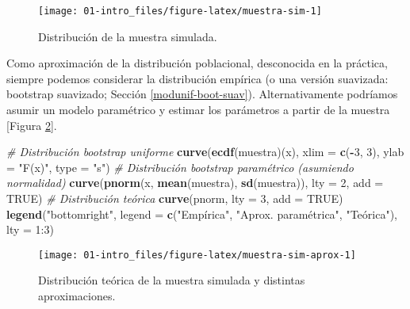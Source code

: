 \documentclass[
]{book}
\newenvironment{Shaded}{\begin{snugshade}}{\end{snugshade}}
\newcommand{\CommentTok}[1]{\textcolor[rgb]{0.56,0.35,0.01}{\textit{#1}}}
\newcommand{\DataTypeTok}[1]{\textcolor[rgb]{0.13,0.29,0.53}{#1}}
\newcommand{\DecValTok}[1]{\textcolor[rgb]{0.00,0.00,0.81}{#1}}
\newcommand{\KeywordTok}[1]{\textcolor[rgb]{0.13,0.29,0.53}{\textbf{#1}}}
\newcommand{\NormalTok}[1]{#1}
\newcommand{\OperatorTok}[1]{\textcolor[rgb]{0.81,0.36,0.00}{\textbf{#1}}}
\newcommand{\OtherTok}[1]{\textcolor[rgb]{0.56,0.35,0.01}{#1}}
\newcommand{\StringTok}[1]{\textcolor[rgb]{0.31,0.60,0.02}{#1}}
\theoremstyle{break}
\theoremstyle{definition}
\theoremstyle{definition}
\theoremstyle{definition}
\theoremstyle{remark}
\begin{document}
\begin{figure}[!htb]

{\centering \texttt{[image: 01-intro\_files/figure-latex/muestra-sim-1]} 

}

\caption{Distribución de la muestra simulada.}\label{fig:muestra-sim}
\end{figure}

Como aproximación de la distribución poblacional, desconocida en la práctica,
siempre podemos considerar la distribución empírica
(o una versión suavizada: bootstrap suavizado; Sección \ref{modunif-boot-suav}).
Alternativamente podríamos asumir un modelo paramétrico y estimar los parámetros a partir de la muestra {[}Figura \ref{fig:muestra-sim-aprox}{]}.

\begin{Shaded}
\begin{Highlighting}[]
\CommentTok{# Distribución bootstrap uniforme}
\KeywordTok{curve}\NormalTok{(}\KeywordTok{ecdf}\NormalTok{(muestra)(x), }\DataTypeTok{xlim =} \KeywordTok{c}\NormalTok{(}\OperatorTok{-}\DecValTok{3}\NormalTok{, }\DecValTok{3}\NormalTok{), }\DataTypeTok{ylab =} \StringTok{"F(x)"}\NormalTok{, }\DataTypeTok{type =} \StringTok{"s"}\NormalTok{)}
\CommentTok{# Distribución bootstrap paramétrico (asumiendo normalidad)}
\KeywordTok{curve}\NormalTok{(}\KeywordTok{pnorm}\NormalTok{(x, }\KeywordTok{mean}\NormalTok{(muestra), }\KeywordTok{sd}\NormalTok{(muestra)), }\DataTypeTok{lty =} \DecValTok{2}\NormalTok{, }\DataTypeTok{add =} \OtherTok{TRUE}\NormalTok{)}
\CommentTok{# Distribución teórica}
\KeywordTok{curve}\NormalTok{(pnorm, }\DataTypeTok{lty =} \DecValTok{3}\NormalTok{, }\DataTypeTok{add =} \OtherTok{TRUE}\NormalTok{)}
\KeywordTok{legend}\NormalTok{(}\StringTok{"bottomright"}\NormalTok{, }\DataTypeTok{legend =} \KeywordTok{c}\NormalTok{(}\StringTok{"Empírica"}\NormalTok{, }\StringTok{"Aprox. paramétrica"}\NormalTok{, }\StringTok{"Teórica"), lty = 1:3)}
\end{Highlighting}
\end{Shaded}

\begin{figure}[!htb]

{\centering \texttt{[image: 01-intro\_files/figure-latex/muestra-sim-aprox-1]} 

}

\caption{Distribución teórica de la muestra simulada y distintas aproximaciones.}\label{fig:muestra-sim-aprox}
\end{figure}
\end{document}
